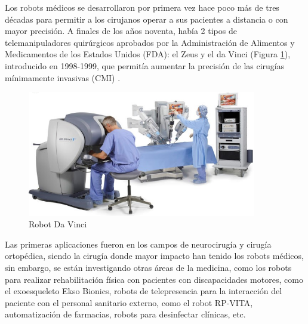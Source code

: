 Los robots médicos se desarrollaron por primera vez hace poco más de tres décadas para permitir a los cirujanos operar a sus pacientes a distancia o con mayor precisión. A finales de los años noventa, había 2 tipos de telemanipuladores quirúrgicos aprobados por la Administración de Alimentos y Medicamentos de los Estados Unidos (FDA): el Zeus y el da Vinci (Figura \ref{fig:RobotDaVinci}), introducido en 1998-1999, que permitía aumentar la precisión de las cirugías mínimamente invasivas (CMI) \cite{Romero20}.\\

\begin{figure} [H]
    \begin{center}
      \includegraphics[width=10cm]{figs/Robot Da Vinci.png}
    \end{center}
    \caption{Robot Da Vinci}
    \label{fig:RobotDaVinci}
\end{figure}

Las primeras aplicaciones fueron en los campos de neurocirugía y cirugía ortopédica, siendo la cirugía donde mayor impacto han tenido los robots médicos, %
sin embargo, se están investigando otras áreas de la medicina, como los robots para realizar rehabilitación física con pacientes con discapacidades motores, como el exoesqueleto Ekso Bionics, robots de telepresencia para la interacción del paciente con el personal sanitario externo, como el robot RP-VITA, automatización de farmacias, robots para desinfectar clínicas, etc. \cite{Dupont21}\\


